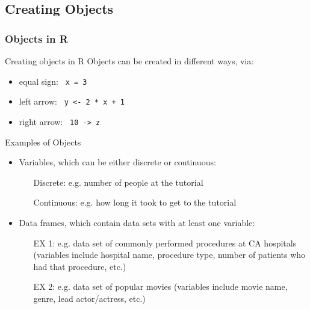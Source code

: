 \subsection{Creating Objects}
\begin{frame}[allowframebreaks]
	\frametitle{Objects in R}
		\begin{block}{Creating objects in R}
Objects can be created in different ways, via:
			\begin{itemize}
				\item equal sign: \lstinline$ x = 3 $
				\item left arrow: \lstinline$ y <- 2 * x + 1 $
				\item right arrow: \lstinline$ 10 -> z $
			\end{itemize}
		\end{block}

\newpage
	\begin{block}{Examples of Objects}
		\begin{itemize}
			\item[]
			\item Variables, which can be either discrete or continuous:
				\begin{itemize} 
					\item[Discrete:] e.g. number of people at the tutorial
					\item[Continuous:] e.g. how long it took to get to the tutorial
				\end{itemize}
			\item[]
			\item Data frames, which contain data sets with at least one variable:
				\begin{itemize} 
					\item[EX 1:] e.g. data set of commonly performed procedures at CA hospitals (variables include hospital name, procedure type, number of patients who had that procedure, etc.)
					\item[EX 2:] e.g. data set of popular movies (variables include movie name, genre, lead actor/actress, etc.)
				\end{itemize}
		\end{itemize}
	\end{block}

\end{frame}

